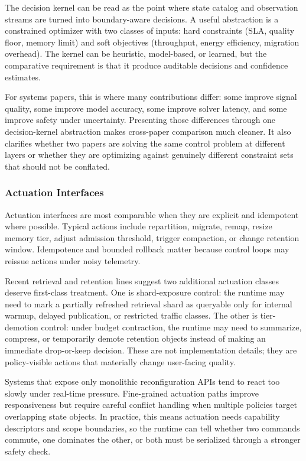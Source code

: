 \documentclass[acmsmall,screen,review]{acmart}
\begin{document}
The decision kernel can be read as the point where state catalog and observation streams are turned into boundary-aware decisions. A useful abstraction is a constrained optimizer with two classes of inputs: hard constraints (SLA, quality floor, memory limit) and soft objectives (throughput, energy efficiency, migration overhead). The kernel can be heuristic, model-based, or learned, but the comparative requirement is that it produce auditable decisions and confidence estimates.

For systems papers, this is where many contributions differ: some improve signal quality, some improve model accuracy, some improve solver latency, and some improve safety under uncertainty. Presenting those differences through one decision-kernel abstraction makes cross-paper comparison much cleaner. It also clarifies whether two papers are solving the same control problem at different layers or whether they are optimizing against genuinely different constraint sets that should not be conflated.

\subsubsection{Actuation Interfaces}

Actuation interfaces are most comparable when they are explicit and idempotent where possible. Typical actions include repartition, migrate, remap, resize memory tier, adjust admission threshold, trigger compaction, or change retention window. Idempotence and bounded rollback matter because control loops may reissue actions under noisy telemetry.

Recent retrieval and retention lines suggest two additional actuation classes deserve first-class treatment. One is shard-exposure control: the runtime may need to mark a partially refreshed retrieval shard as queryable only for internal warmup, delayed publication, or restricted traffic classes. The other is tier-demotion control: under budget contraction, the runtime may need to summarize, compress, or temporarily demote retention objects instead of making an immediate drop-or-keep decision. These are not implementation details; they are policy-visible actions that materially change user-facing quality.

Systems that expose only monolithic reconfiguration APIs tend to react too slowly under real-time pressure. Fine-grained actuation paths improve responsiveness but require careful conflict handling when multiple policies target overlapping state objects. In practice, this means actuation needs capability descriptors and scope boundaries, so the runtime can tell whether two commands commute, one dominates the other, or both must be serialized through a stronger safety check.
\end{document}
